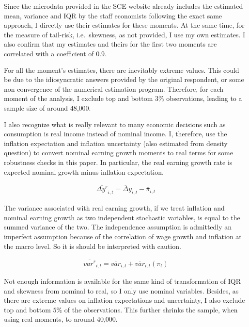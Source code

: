 \documentclass[12pt,notitlepage,onecolumn,aps,pra]{article}
\begin{document}
Since the microdata provided in the SCE website already includes the
estimated mean, variance and IQR by the staff economists following the
exact same approach, I directly use their estimates for these moments.
At the same time, for the measure of tail-risk, i.e.~skewness, as not
provided, I use my own estimates. I also confirm that my estimates and
theirs for the first two moments are correlated with a coefficient of
0.9.

For all the moment's estimates, there are inevitably extreme values.
This could be due to the idiosyncratic answers provided by the original
respondent, or some non-convergence of the numerical estimation program.
Therefore, for each moment of the analysis, I exclude top and bottom
\(3\%\) observations, leading to a sample size of around 48,000.

I also recognize what is really relevant to many economic decisions such
as consumption is real income instead of nominal income. I, therefore,
use the inflation expectation and inflation uncertainty (also estimated
from density question) to convert nominal earning growth moments to real
terms for some robustness checks in this paper. In particular, the real
earning growth rate is expected nominal growth minus inflation
expectation.

\begin{eqnarray}
\overline {\Delta y^{r}}_{i,t} = \overline\Delta y_{i,t} - \overline \pi_{i,t}
\end{eqnarray}

The variance associated with real earning growth, if we treat inflation
and nominal earning growth as two independent stochastic variables, is
equal to the summed variance of the two. The independence assumption is
admittedly an imperfect assumption because of the correlation of wage
growth and inflation at the macro level. So it is should be interpreted
with caution.

\begin{eqnarray}
\overline{var^{r}}_{i,t} = \overline{var}_{i,t} + \overline{var}_{i,t}(\pi_{t})
\end{eqnarray}

Not enough information is available for the same kind of transformation
of IQR and skewness from nominal to real, so I only use nominal
variables. Besides, as there are extreme values on inflation
expectations and uncertainty, I also exclude top and bottom \(5\%\) of
the observations. This further shrinks the sample, when using real
moments, to around 40,000.
\end{document}
